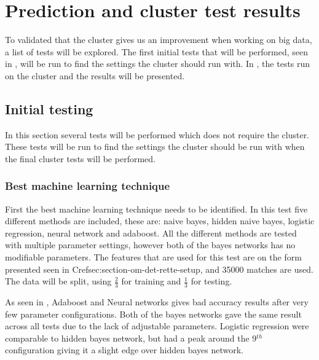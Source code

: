 \section{Prediction and cluster test results}\label{sec:testing}
To validated that the cluster gives us an improvement when working on big data, a list of tests will be explored. The first initial tests that will be performed, seen in , will be run to find the settings the cluster should run with. In , the tests run on the cluster and the results will be presented.

\subsection{Initial testing}\label{sec:initialtest}
In this section several tests will be performed which does not require the cluster. These tests will be run to find the settings the cluster should be run with when the final cluster tests will be performed.

\subsubsection{Best machine learning technique}
First the best machine learning technique needs to be identified. In this test five different methods are included, these are: naive bayes, hidden naive bayes, logistic regression, neural network and adaboost. All the different methods are tested with multiple parameter settings, however both of the bayes networks has no modifiable parameters. The features that are used for this test are on the form presented seen in Cref{sec:section-om-det-rette-setup}, and 35000 matches are used. The data will be split, using $\frac{2}{3}$ for training and $\frac{1}{3}$ for testing. 

As seen in , Adaboost and Neural networks gives bad accuracy results after very few parameter configurations. Both of the bayes networks gave the same result across all tests due to the lack of adjustable parameters. Logistic regression were comparable to hidden bayes network, but had a peak around the 9$^{th}$ configuration giving it a slight edge over hidden bayes network.


